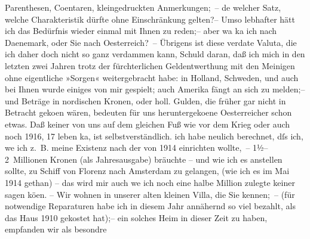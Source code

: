 \begin{ledgroupsized}[t]{13cm}
                    Parenthesen, Co{\geminationm}entaren, kleingedruckten
                    Anmerkungen; – de{\geminationn} welcher Satz, welche
                    Charakteristik dürfte ohne Einschränkung gelten?– Umso lebhafter hätt ich das
                    Bedürfnis wieder einmal mit Ihnen zu reden;– aber wa{\geminationn} ka{\geminationn} ich nach Daenemark, oder Sie nach Oesterreich? –\pend
           \pstart
           Übrigens ist  diese verda{\geminationm}te Valuta, die ich daher doch nicht so ganz
                    verdammen kann, \introOben{}Schuld daran\introOben{}, daß ich mich in den
                    letzten zwei Jahren trotz der fürchterlichen Geldentwerthung mit den Meinigen
                    ohne eigentliche »Sorgen« weitergebracht habe: in Holland, Schweden, und auch bei
                    Ihnen wurde einiges von mir gespielt; auch Amerika fängt an sich zu melden;– und  Beträge in nordischen Kronen, oder holl.
                    Gulden, die früher gar nicht in Betracht geko{\geminationm}en
                        {\pb}wären, bedeuten für uns heruntergeko{\geminationm}ene Oesterreicher schon etwas. Daß keiner von uns auf dem gleichen Fuß wie
                    vor dem Krieg oder auch noch 1916, 17 leben ka{\geminationn}, ist selbstverständlich. ich habe neulich
                    berechnet, dſs ich, we{\geminationn} ich z. B. meine Existenz
                    nach  der von 1914 einrichten
                    wollte, – 1½–2 Millionen Kronen \introOben{}(als Jahresausgabe)\introOben{}
                    bräuchte – und wie ich es anstellen sollte, zu Schiff von Florenz nach Amsterdam
                    zu gelangen, (wie ich es im Mai 1914 gethan) – das wird mir \introOben{}auch we{\geminationn} ich noch eine halbe
                        Million zulegte\introOben{} keiner sagen kö{\geminationn}en. – Wir
                    wohnen  in unserer alten kleinen Villa, die
                    Sie kennen; – (für notwendige Reparaturen habe ich in diesem Jahr annähernd so
                    viel bezahlt, als das Haus 1910 gekostet hat);– ein solches Heim in
                    dieser Zeit \introOben{}zu\introOben{} haben, empfanden wir als besondre

\end{ledgroupsized}
